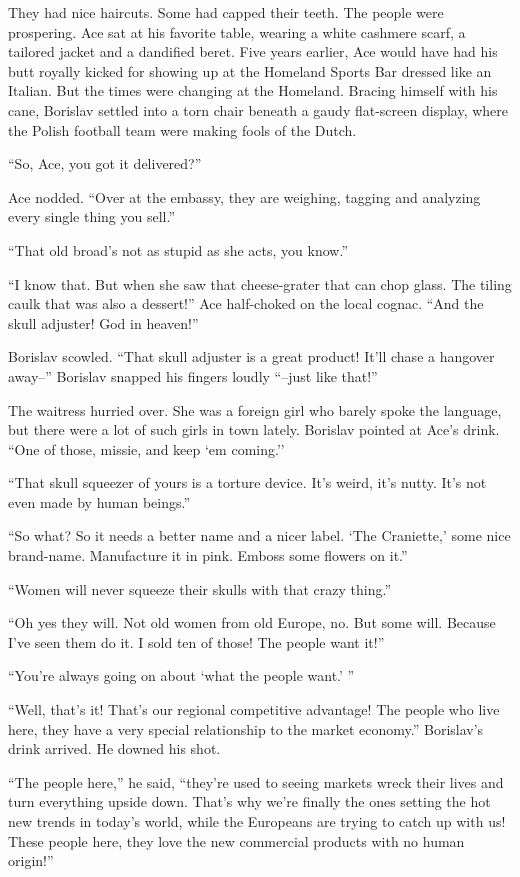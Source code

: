 \documentclass[20 pt,twoside,extrafontsizes,final]{memoir}
\begin{document}
They had nice haircuts. Some had capped their teeth. The people were prospering.
Ace sat at his favorite table, wearing a white cashmere scarf, a tailored jacket and a dandified beret. Five years earlier, Ace would have had his butt royally kicked for showing up at the Homeland Sports Bar dressed like an Italian. But the times were changing at the Homeland.
Bracing himself with his cane, Borislav settled into a torn chair beneath a gaudy flat-screen display, where the Polish football team were making fools of the Dutch.

``So, Ace, you got it delivered?''

Ace nodded. ``Over at the embassy, they are weighing, tagging and analyzing every single thing you sell.''

``That old broad's not as stupid as she acts, you know.''

``I know that. But when she saw that cheese-grater that can chop glass. The tiling caulk that was also a dessert!'' Ace half-choked on the local cognac. ``And the skull adjuster! God in heaven!''

Borislav scowled. ``That skull adjuster is a great product! It'll chase a hangover away--'' Borislav snapped his fingers loudly ``--just like that!''

The waitress hurried over. She was a foreign girl who barely spoke the language, but there were a lot of such girls in town lately. Borislav pointed at Ace's drink. ``One of those, missie, and keep `em coming.''

``That skull squeezer of yours is a torture device. It's weird, it's nutty. It's not even made by human beings.''

``So what? So it needs a better name and a nicer label. `The Craniette,' some nice brand-name. Manufacture it in pink. Emboss some flowers on it.''

``Women will never squeeze their skulls with that crazy thing.''

``Oh yes they will. Not old women from old Europe, no. But some will. Because I've seen them do it. I sold ten of those! The people want it!''

``You're always going on about `what the people want.' ''

``Well, that's it! That's our regional competitive advantage! The people who live here, they have a very special relationship to the market economy.'' Borislav's drink arrived. He downed his shot.

``The people here,'' he said, ``they're used to seeing markets wreck their lives and turn everything upside down. That's why we're finally the ones setting the hot new trends in today's world, while the Europeans are trying to catch up with us! These people here, they love the new commercial products with no human origin!''
\end{document}
